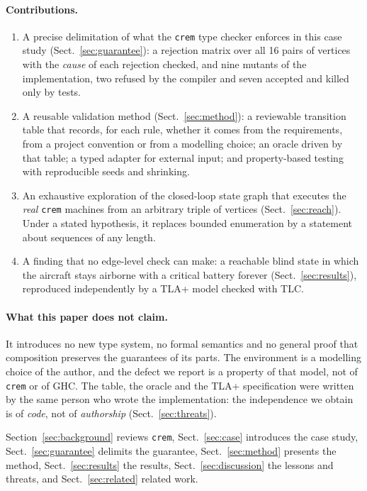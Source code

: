\documentclass[review]{jfp-epi}
\newcommand{\crem}{\texttt{crem}}
\begin{document}
\paragraph{Contributions.}
\begin{enumerate}
\item A precise delimitation of what the \crem{} type checker enforces in this case study (Sect.~\ref{sec:guarantee}): a rejection matrix over all 16 pairs of vertices with the \emph{cause} of each rejection checked, and nine mutants of the implementation, two refused by the compiler and seven accepted and killed only by tests.
\item A reusable validation method (Sect.~\ref{sec:method}): a reviewable transition table that records, for each rule, whether it comes from the requirements, from a project convention or from a modelling choice; an oracle driven by that table; a typed adapter for external input; and property-based testing with reproducible seeds and shrinking.
\item An exhaustive exploration of the closed-loop state graph that executes the \emph{real} \crem{} machines from an arbitrary triple of vertices (Sect.~\ref{sec:reach}). Under a stated hypothesis, it replaces bounded enumeration by a statement about sequences of any length.
\item A finding that no edge-level check can make: a reachable blind state in which the aircraft stays airborne with a critical battery forever (Sect.~\ref{sec:results}), reproduced independently by a TLA+ model checked with TLC.
\end{enumerate}

\paragraph{What this paper does not claim.} It introduces no new type system, no formal semantics and no general proof that composition preserves the guarantees of its parts. The environment is a modelling choice of the author, and the defect we report is a property of that model, not of \crem{} or of GHC. The table, the oracle and the TLA+ specification were written by the same person who wrote the implementation: the independence we obtain is of \emph{code}, not of \emph{authorship} (Sect.~\ref{sec:threats}).

Section~\ref{sec:background} reviews \crem{}, Sect.~\ref{sec:case} introduces the case study, Sect.~\ref{sec:guarantee} delimits the guarantee, Sect.~\ref{sec:method} presents the method, Sect.~\ref{sec:results} the results, Sect.~\ref{sec:discussion} the lessons and threats, and Sect.~\ref{sec:related} related work.
\end{document}
